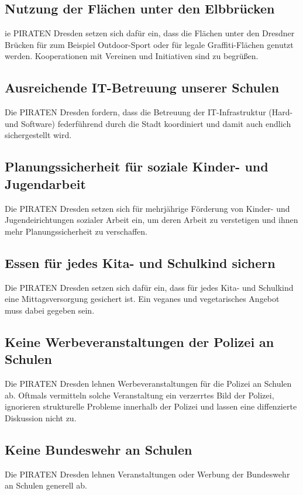 \documentclass[a4paper, 11pt]{article}
\begin{document}
\subsection{Nutzung der Flächen unter den Elbbrücken}
ie PIRATEN Dresden setzen sich dafür ein, dass die Flächen unter den Dresdner Brücken für zum Beispiel Outdoor-Sport oder für legale Graffiti-Flächen genutzt werden. Kooperationen mit Vereinen und Initiativen sind zu begrüßen.


\subsection{Ausreichende IT-Betreuung unserer Schulen}
Die PIRATEN Dresden fordern, dass die Betreuung der IT-Infrastruktur (Hard- und Software) federführend durch die Stadt koordiniert und damit auch endlich sichergestellt wird.


\subsection{Planungssicherheit für soziale Kinder- und Jugendarbeit}
Die PIRATEN Dresden setzen sich für mehrjährige Förderung von Kinder- und Jugendeirichtungen sozialer Arbeit ein, um deren Arbeit zu verstetigen und ihnen mehr Planungssicherheit zu verschaffen.


\subsection{Essen für jedes Kita- und Schulkind sichern}
Die PIRATEN Dresden setzen sich dafür ein, dass für jedes Kita- und Schulkind eine Mittagsversorgung gesichert ist. Ein veganes und vegetarisches Angebot muss dabei gegeben sein.



\subsection{Keine Werbeveranstaltungen der Polizei an Schulen}
Die PIRATEN Dresden lehnen Werbeveranstaltungen für die Polizei an Schulen ab. Oftmals vermitteln solche Veranstaltung ein verzerrtes Bild der Polizei, ignorieren strukturelle Probleme innerhalb der Polizei und lassen eine diffenzierte Diskussion nicht zu.


\subsection{Keine Bundeswehr an Schulen}
Die PIRATEN Dresden lehnen Veranstaltungen oder Werbung der Bundeswehr an Schulen generell ab.
\end{document}
